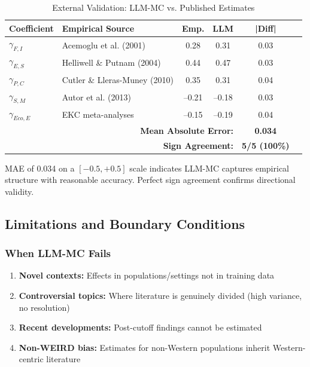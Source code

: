\begin{table}[htbp]
\centering
\caption{External Validation: LLM-MC vs. Published Estimates}
\label{tab:validation}
\small
\begin{tabular}{@{}llcccc@{}}
\toprule
\textbf{Coefficient} & \textbf{Empirical Source} & \textbf{Emp.} & \textbf{LLM} & \textbf{|Diff|} \\
\midrule
$\gamma_{F,I}$ & Acemoglu et al. (2001) & 0.28 & 0.31 & 0.03 \\
$\gamma_{E,S}$ & Helliwell \& Putnam (2004) & 0.44 & 0.47 & 0.03 \\
$\gamma_{P,C}$ & Cutler \& Lleras-Muney (2010) & 0.35 & 0.31 & 0.04 \\
$\gamma_{S,M}$ & Autor et al. (2013) & --0.21 & --0.18 & 0.03 \\
$\gamma_{Eco,E}$ & EKC meta-analyses & --0.15 & --0.19 & 0.04 \\
\midrule
\multicolumn{4}{r}{\textbf{Mean Absolute Error:}} & \textbf{0.034} \\
\multicolumn{4}{r}{\textbf{Sign Agreement:}} & \textbf{5/5 (100\%)} \\
\bottomrule
\end{tabular}
\end{table}

MAE of 0.034 on a $[-0.5, +0.5]$ scale indicates LLM-MC captures empirical structure with reasonable accuracy. Perfect sign agreement confirms directional validity.

\subsection{Limitations and Boundary Conditions}

\subsubsection{When LLM-MC Fails}

\begin{enumerate}
    \item \textbf{Novel contexts:} Effects in populations/settings not in training data
    \item \textbf{Controversial topics:} Where literature is genuinely divided (high variance, no resolution)
    \item \textbf{Recent developments:} Post-cutoff findings cannot be estimated
    \item \textbf{Non-WEIRD bias:} Estimates for non-Western populations inherit Western-centric literature
\end{enumerate}


